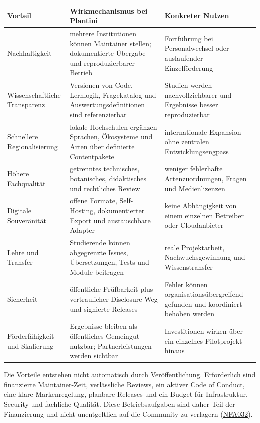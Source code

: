 \documentclass[10pt,a4paper,oneside]{article}
\newcommand{\R}[1]{\hyperlink{req:#1}{\textcolor{Forest}{#1}}}
\begin{document}
\begin{tabularx}{\textwidth}{@{}p{35mm}X X@{}}
\toprule
\textbf{Vorteil} & \textbf{Wirkmechanismus bei Plantini} & \textbf{Konkreter Nutzen} \\
\midrule
Nachhaltigkeit & mehrere Institutionen können Maintainer stellen; dokumentierte Übergabe und reproduzierbarer Betrieb & Fortführung bei Personalwechsel oder auslaufender Einzelförderung \\
Wissenschaftliche Transparenz & Versionen von Code, Lernlogik, Fragekatalog und Auswertungsdefinitionen sind referenzierbar & Studien werden nachvollziehbarer und Ergebnisse besser reproduzierbar \\
Schnellere Regionalisierung & lokale Hochschulen ergänzen Sprachen, Ökosysteme und Arten über definierte Contentpakete & internationale Expansion ohne zentralen Entwicklungsengpass \\
Höhere Fachqualität & getrenntes technisches, botanisches, didaktisches und rechtliches Review & weniger fehlerhafte Artenzuordnungen, Fragen und Medienlizenzen \\
Digitale Souveränität & offene Formate, Self-Hosting, dokumentierter Export und austauschbare Adapter & keine Abhängigkeit von einem einzelnen Betreiber oder Cloudanbieter \\
Lehre und Transfer & Studierende können abgegrenzte Issues, Übersetzungen, Tests und Module beitragen & reale Projektarbeit, Nachwuchsgewinnung und Wissenstransfer \\
Sicherheit & öffentliche Prüfbarkeit plus vertraulicher Disclosure-Weg und signierte Releases & Fehler können organisationsübergreifend gefunden und koordiniert behoben werden \\
Förderfähigkeit und Skalierung & Ergebnisse bleiben als öffentliches Gemeingut nutzbar; Partnerleistungen werden sichtbar & Investitionen wirken über ein einzelnes Pilotprojekt hinaus \\
\bottomrule
\end{tabularx}

Die Vorteile entstehen nicht automatisch durch Veröffentlichung. Erforderlich sind finanzierte Maintainer-Zeit, verlässliche Reviews, ein aktiver Code of Conduct, eine klare Markenregelung, planbare Releases und ein Budget für Infrastruktur, Security und fachliche Qualität. Diese Betriebsaufgaben sind daher Teil der Finanzierung und nicht unentgeltlich auf die Community zu verlagern (\R{NFA032}).

\end{document}
